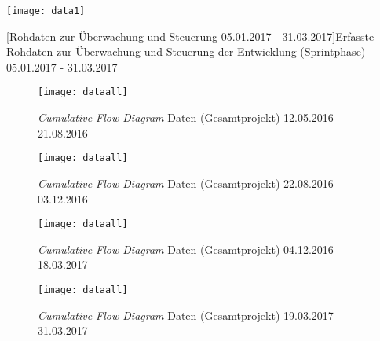 \begin{landscape}
	\parbox[c][\textwidth][s]{\linewidth}{%
		\vfill
		\captionsetup{type=figure}\texttt{[image: data1]}
		
		\vfill	
	}
	[Rohdaten zur Überwachung und Steuerung 05.01.2017 - 31.03.2017]{Erfasste Rohdaten zur Überwachung und Steuerung der Entwicklung (Sprintphase) 05.01.2017 - 31.03.2017}
\end{landscape}





\newpage
{}
\resetHeadWidth
\setlength{\abovecaptionskip}{-30pt} %




\begin{figure}
	\label{cfddataall}
	\centering
	\captionsetup{type=table}\texttt{[image: dataall]}
	
	\caption{\textit{Cumulative Flow Diagram} Daten (Gesamtprojekt) 12.05.2016 - 21.08.2016}
\end{figure}
 
\begin{figure}
	\centering
	\captionsetup{type=table}\texttt{[image: dataall]}
	\caption{\textit{Cumulative Flow Diagram} Daten (Gesamtprojekt) 22.08.2016 - 03.12.2016}
\end{figure}

\begin{figure}
	\centering
	\captionsetup{type=table}\texttt{[image: dataall]}
	\caption{\textit{Cumulative Flow Diagram} Daten (Gesamtprojekt) 04.12.2016 - 18.03.2017}
\end{figure}

\begin{figure}
	\centering
	\captionsetup{type=table}\texttt{[image: dataall]}
	\caption{\textit{Cumulative Flow Diagram} Daten (Gesamtprojekt) 19.03.2017 - 31.03.2017}
\end{figure}





\restoregeometry
